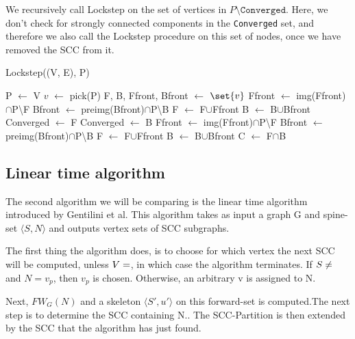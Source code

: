 \documentclass[../master.tex]{subfiles}
\newcommand{\FW}[2][G]{\ensuremath{FW_{#1}(#2)}}
\newcommand{\pair}[2]{\ensuremath{\langle #1, #2\rangle}}
\newcommand*\Let[2]{\State #1 $\gets$ #2}
\begin{document}
We recursively call Lockstep on the set of vertices in $P\setminus \texttt{Converged}$. Here, we don't check for strongly connected components in the \texttt{Converged} set, and therefore we also call the Lockstep procedure on this set of nodes, once we have removed the SCC from it.
\begin{algorithm}
  \caption{Lockstep((V, E), P)}
  \begin{algorithmic}[1]
    \Let{P}{V}
    \Statex
    \State \Return
    \EndIf
    \Statex
      \Let{$v$}{pick(P)}
      \Let{F, B, Ffront, Bfront}{$\set{v}$}
      \Statex
      \Let{Ffront}{img(Ffront)$\cap$P\textbackslash F}
      \Let{Bfront}{preimg(Bfront)$\cap$P\textbackslash B}
      \Let{F}{F$\cup$Ffront}
       \Let{B}{B$\cup$Bfront}
       \EndWhile
       \Statex
        \Let{Converged}{F}
        \Else
        \Let{Converged}{B}
          \EndIf
      \Statex
       \Let{Ffront}{img(Ffront)$\cap$P\textbackslash F}
       \Let{Bfront}{preimg(Bfront)$\cap$P\textbackslash B}
       \Let{F}{F$\cup$Ffront}
       \Let{B}{B$\cup$Bfront}
       \EndWhile
       \Statex
       \Let{C}{F$\cap$B}
  \end{algorithmic}
\end{algorithm}
\subsection{Linear time algorithm}
The second algorithm we will be comparing is the linear time algorithm \cite{linear} introduced by Gentilini et al. This algorithm takes as input a graph G and spine-set $\langle S, N\rangle$ and outputs vertex sets of SCC subgraphs.

The first thing the algorithm does, is to choose for which vertex the next SCC will be computed, unless $V=\empty$, in which case the algorithm terminates. If $S\neq\empty$ and $N={v_p}$, then $v_p$ is chosen. Otherwise, an arbitrary v is assigned to N.

Next, \FW{N} and a skeleton \pair{S'}{u'} on this forward-set is computed.The next step is to determine the SCC containing N.. The SCC-Partition is then extended by the SCC that the algorithm has just found. 
\end{document}
